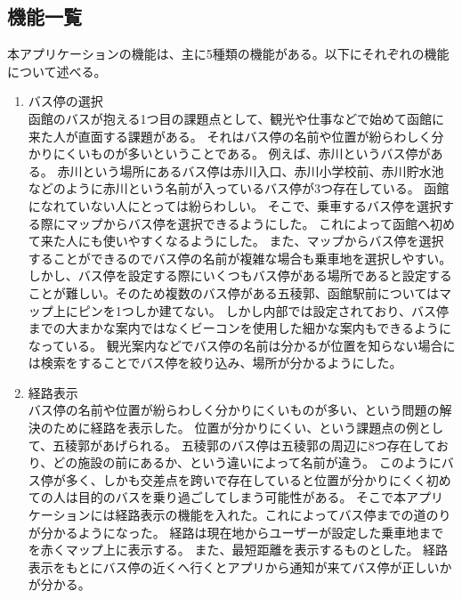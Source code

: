 \documentclass[openany,11pt,papersize]{jsbook}
\begin{document}
\subsection{機能一覧}
本アプリケーションの機能は、主に5種類の機能がある。以下にそれぞれの機能について述べる。
\begin{enumerate}

\item バス停の選択\\
函館のバスが抱える1つ目の課題点として、観光や仕事などで始めて函館に来た人が直面する課題がある。
それはバス停の名前や位置が紛らわしく分かりにくいものが多いということである。
例えば、赤川というバス停がある。
赤川という場所にあるバス停は赤川入口、赤川小学校前、赤川貯水池などのように赤川という名前が入っているバス停が3つ存在している。
函館になれていない人にとっては紛らわしい。
そこで、乗車するバス停を選択する際にマップからバス停を選択できるようにした。
これによって函館へ初めて来た人にも使いやすくなるようにした。
また、マップからバス停を選択することができるのでバス停の名前が複雑な場合も乗車地を選択しやすい。
しかし、バス停を設定する際にいくつもバス停がある場所であると設定することが難しい。そのため複数のバス停がある五稜郭、函館駅前についてはマップ上にピンを1つしか建てない。
しかし内部では設定されており、バス停までの大まかな案内ではなくビーコンを使用した細かな案内もできるようになっている。
観光案内などでバス停の名前は分かるが位置を知らない場合には検索をすることでバス停を絞り込み、場所が分かるようにした。

\item 経路表示\mbox{}\\
バス停の名前や位置が紛らわしく分かりにくいものが多い、という問題の解決のために経路を表示した。
位置が分かりにくい、という課題点の例として、五稜郭があげられる。
五稜郭のバス停は五稜郭の周辺に8つ存在しており、どの施設の前にあるか、という違いによって名前が違う。
このようにバス停が多く、しかも交差点を跨いで存在していると位置が分かりにくく初めての人は目的のバスを乗り過ごしてしまう可能性がある。
そこで本アプリケーションには経路表示の機能を入れた。これによってバス停までの道のりが分かるようになった。
経路は現在地からユーザーが設定した乗車地までを赤くマップ上に表示する。
また、最短距離を表示するものとした。
経路表示をもとにバス停の近くへ行くとアプリから通知が来てバス停が正しいかが分かる。


\end{enumerate}
\end{document}
